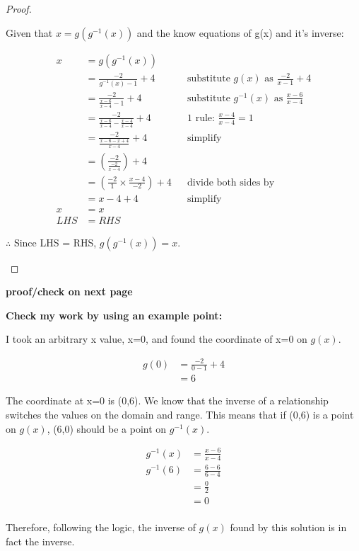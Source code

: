 \documentclass[12pt]{book}
\begin{document}
\begin{enumerate}
\begin{proof}
    \begin{center}
        Given that $x = g(g^{-1}(x))$ and the know equations of g(x) and it's inverse:
    \end{center}
    \vspace{-2em}

    \begin{align*}
        x &= g(g^{-1}(x)) \\
        &= \frac{-2}{g^{-1}(x)-1}+4 && \text{substitute $g(x)$ as $\frac{-2}{x-1}+4$} \\
        &= \frac{-2}{\frac{x-6}{x-4}-1}+4 && \text{substitute $g^{-1}(x)$ as $\frac{x-6}{x-4}$} \\
        &= \frac{-2}{\frac{x-6}{x-4}-\frac{x-4}{x-4}}+4 && \text{1 rule: } \frac{x-4}{x-4} = 1 \\
        &= \frac{-2}{\frac{x-6-x+4}{x-4}}+4 && \text{simplify} \\
        &= \left( \frac{-2}{\frac{-2}{x-4}} \right) +4 \\
        &= \left( \frac{-2}{1} \times \frac{x-4}{-2} \right) +4 && \text{divide both sides by } \\
        &= x-4+4 && \text{simplify} \\
        x &= x \\
        LHS &= RHS
    \end{align*}

    \begin{center}
        $\therefore$ Since LHS = RHS, $g(g^{-1}(x)) = x$. \qedhere
    \end{center}
\end{proof}
\vspace{2em}
\begin{center}
    \textbf{proof/check on next page}
\end{center}
\newpage

\textbf{Check my work by using an example point:}
\vspace{1em}

I took an arbitrary x value, x=0, and found the coordinate of x=0 on $g(x)$.

\begin{align*}
    g(0) &= \frac{-2}{0-1}+4 \\
    &= 6
\end{align*}

The coordinate at x=0 is (0,6). We know that the inverse of a relationship switches the values on the domain and range.
This means that if (0,6) is a point on $g(x)$, (6,0) should be a point on $g^{-1}(x)$.

\begin{align*}
    g^{-1}(x) &= \frac{x-6}{x-4} \\
    g^{-1}(6) &= \frac{6-6}{6-4} \\
    &= \frac{0}{2} \\
    &= 0 \\
\end{align*}
\vspace{-3em}

Therefore, following the logic, the inverse of $g(x)$ found by this solution is in fact the inverse.
\newpage

\end{enumerate}
\end{document}

